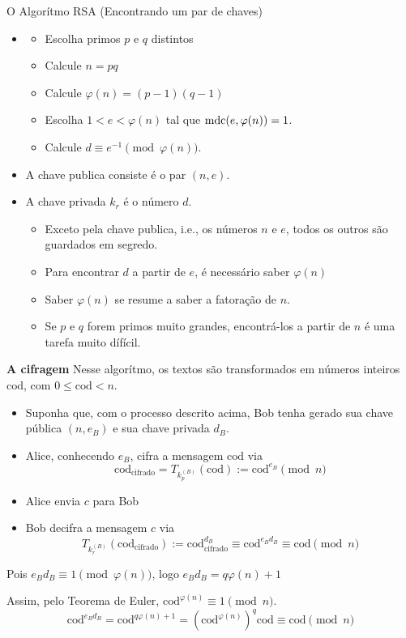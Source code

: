 \documentclass[12pt]{beamer}
\begin{document}
\begin{frame}
  {O Algorítmo RSA (Encontrando um par de chaves)}
\begin{itemize}
  \item 
  \begin{itemize}
    \item Escolha primos $p$ e $q$ distintos
    \item Calcule $n = pq$
    \item Calcule $\varphi(n) = (p-1)(q-1)$
    \item Escolha $1 < e < \varphi(n)$ tal que ${\rm mdc}(e,\varphi(n)) = 1$.
    \item Calcule $d \equiv e^{-1} \pmod {\varphi(n)}$.
  \end{itemize}

  \item A chave publica consiste é o par $(n,e)$.
  \item A chave privada $k_r$ é o número $d$.
  \begin{itemize}
    \item Exceto pela chave publica, i.e., os números $n$ e $e$, todos os outros
    são guardados em segredo.
    \item Para encontrar $d$ a partir de $e$, é necessário  saber $\varphi(n)$
    \item Saber $\varphi(n)$ se resume a saber a fatoração de $n$.
    \item Se $p$ e $q$ forem primos muito grandes, encontrá-los a partir de $n$
    é uma tarefa muito dífícil.
  \end{itemize}
\end{itemize}
\end{frame}

\begin{frame}
  {\bf A cifragem}
  Nesse algorítmo, os textos são transformados em números inteiros $\mathrm{cod}$, com
  $0\leq \mathrm{cod} < n$.
  \begin{itemize}
    \item Suponha que, com o processo descrito acima, Bob tenha gerado sua
    chave pública $(n,e_B)$ e sua chave privada $d_B$.
    \item Alice, conhecendo $e_B$, cifra a mensagem $\mathrm{cod}$ via
    $$
      \mathrm{cod}_{\mathrm{cifrado}} = T_{k_p^{(B)}}(\mathrm{cod}) := \mathrm{cod}^{e_B} \pmod n
    $$
    \item Alice envia $c$ para Bob
    \item Bob decifra a mensagem $c$ via
    $$
      T_{k_r^{(B)}}(\mathrm{cod}_{\mathrm{cifrado}}) := \mathrm{cod}_{\mathrm{cifrado}}^{d_B} \equiv \mathrm{cod}^{e_Bd_B} \equiv \mathrm{cod} \pmod n
    $$
  \end{itemize}
  Pois $e_Bd_B \equiv 1 \pmod {\varphi(n)}$, logo $e_Bd_B  = q\varphi(n) + 1$
  
  Assim, pelo Teorema de Euler, $\mathrm{cod}^{\varphi(n)} \equiv 1 \pmod n$.
    $$
      \mathrm{cod}^{e_Bd_B} = \mathrm{cod}^{q\varphi(n) + 1}=
        (\mathrm{cod}^{\varphi(n)})^q\mathrm{cod} \equiv \mathrm{cod} \pmod n
    $$
\end{frame}
\end{document}
